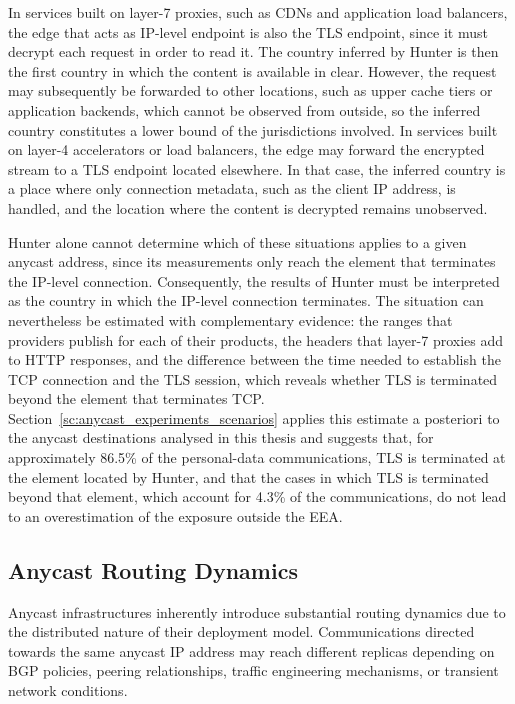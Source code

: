 In services built on layer-7 proxies, such as CDNs and application load balancers, the edge that acts as IP-level endpoint is also the TLS endpoint, since it must decrypt each request in order to read it. The country inferred by Hunter is then the first country in which the content is available in clear. However, the request may subsequently be forwarded to other locations, such as upper cache tiers or application backends, which cannot be observed from outside, so the inferred country constitutes a lower bound of the jurisdictions involved. In services built on layer-4 accelerators or load balancers, the edge may forward the encrypted stream to a TLS endpoint located elsewhere. In that case, the inferred country is a place where only connection metadata, such as the client IP address, is handled, and the location where the content is decrypted remains unobserved.

Hunter alone cannot determine which of these situations applies to a given anycast address, since its measurements only reach the element that terminates the IP-level connection. Consequently, the results of Hunter must be interpreted as the country in which the IP-level connection terminates. The situation can nevertheless be estimated with complementary evidence: the ranges that providers publish for each of their products, the headers that layer-7 proxies add to HTTP responses, and the difference between the time needed to establish the TCP connection and the TLS session, which reveals whether TLS is terminated beyond the element that terminates TCP. Section~\ref{sc:anycast_experiments_scenarios} applies this estimate a posteriori to the anycast destinations analysed in this thesis and suggests that, for approximately 86.5\% of the personal-data communications, TLS is terminated at the element located by Hunter, and that the cases in which TLS is terminated beyond that element, which account for 4.3\% of the communications, do not lead to an overestimation of the exposure outside the EEA.

\subsection{Anycast Routing Dynamics}
\label{sc:hunter_limitations_anycast_routing_dynamics}

Anycast infrastructures inherently introduce substantial routing dynamics due to the distributed nature of their deployment model. Communications directed towards the same anycast IP address may reach different replicas depending on BGP policies, peering relationships, traffic engineering mechanisms, or transient network conditions.

